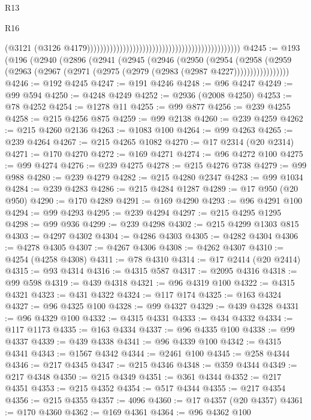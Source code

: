 \begin{lexlean}{R13}
\begin{lexlean}{R16}
\begin{coremodule}
{{{{{{{{{{{{{{{{{{{{{{{{{{{{{{{{{{{{{{{{{{{{{{{{{{{{{{{{{{{{{{{{{{{{{{{{{{{{{{{{{{{{{{{{{{{{{{{{{{{{{{{{{{{{{{{{{                                                                                              (@3121
                                                                                                (@3126
                                                                                                  @4179)))))))))))))))))))))))))))))))))))))))))))))))
@4245 := @193
    (@196
      (@2940
        (@2896
          (@2941
            (@2945
              (@2946
                (@2950
                  (@2954
                    (@2958
                      (@2959 (@2963 (@2967 (@2971 (@2975 (@2979 (@2983 (@2987 @4227)))))))))))))))))
@4246 := @192 @4245
@4247 := @191 @4246
@4248 := @96 @4247
@4249 := @99 @594
@4250 := @4248 @4249
@4252 := @2936 (@2008 @4250)
@4253 := @78 @4252
@4254 := @1278 @11
@4255 := @99 @877
@4256 := @239 @4255
@4258 := @215 @4256 @875
@4259 := @99 @2138
@4260 := @239 @4259
@4262 := @215 @4260 @2136
@4263 := @1083 @100
@4264 := @99 @4263
@4265 := @239 @4264
@4267 := @215 @4265 @1082
@4270 := @17 @2314 (@20 @2314)
@4271 := @170 @4270
@4272 := @169 @4271
@4274 := @96 @4272 @100
@4275 := @99 @4274
@4276 := @239 @4275
@4278 := @215 @4276 @738
@4279 := @99 @988
@4280 := @239 @4279
@4282 := @215 @4280 @2347
@4283 := @99 @1034
@4284 := @239 @4283
@4286 := @215 @4284 @1287
@4289 := @17 @950 (@20 @950)
@4290 := @170 @4289
@4291 := @169 @4290
@4293 := @96 @4291 @100
@4294 := @99 @4293
@4295 := @239 @4294
@4297 := @215 @4295 @1295
@4298 := @99 @936
@4299 := @239 @4298
@4302 := @215 @4299 @1303 @815
@4303 := @4297 @4302
@4304 := @4286 @4303
@4305 := @4282 @4304
@4306 := @4278 @4305
@4307 := @4267 @4306
@4308 := @4262 @4307
@4310 := @4254 (@4258 @4308)
@4311 := @78 @4310
@4314 := @17 @2414 (@20 @2414)
@4315 := @93 @4314
@4316 := @4315 @587
@4317 := @2095 @4316
@4318 := @99 @598
@4319 := @439 @4318
@4321 := @96 @4319 @100
@4322 := @4315 @4321
@4323 := @431 @4322
@4324 := @117 @174
@4325 := @163 @4324
@4327 := @96 @4325 @100
@4328 := @99 @4327
@4329 := @439 @4328
@4331 := @96 @4329 @100
@4332 := @4315 @4331
@4333 := @434 @4332
@4334 := @117 @1173
@4335 := @163 @4334
@4337 := @96 @4335 @100
@4338 := @99 @4337
@4339 := @439 @4338
@4341 := @96 @4339 @100
@4342 := @4315 @4341
@4343 := @1567 @4342
@4344 := @2461 @100
@4345 := @258 @4344
@4346 := @217 @4345
@4347 := @215 @4346
@4348 := @359 @4344
@4349 := @217 @4348
@4350 := @215 @4349
@4351 := @361 @4344
@4352 := @217 @4351
@4353 := @215 @4352
@4354 := @517 @4344
@4355 := @217 @4354
@4356 := @215 @4355
@4357 := 4096
@4360 := @17 @4357 (@20 @4357)
@4361 := @170 @4360
@4362 := @169 @4361
@4364 := @96 @4362 @100
}}}}}}}}}}}}}}}}}}}}}}}}}}}}}}}}}}}}}}}}}}}}}}}}}}}}}}}}}}}}}}}}}}}}}}}}}}}}}}}}}}}}}}}}}}}}}}}}}}}}}}}}}}}}}}}}}
\end{coremodule}
\end{lexlean}
\end{lexlean}

